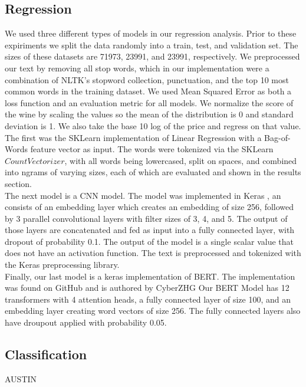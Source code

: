 \documentclass[11pt]{article}
\begin{document}
\subsection{Regression}
    We used three different types of models in our regression analysis. Prior to these expiriments we split the data randomly into a train, test, and validation set. The sizes of these datasets are 71973, 23991, and 23991, respectively. We preprocessed our text by removing all stop words, which in our implementation were a combination of NLTK's stopword collection, punctuation, and the top 10 most common words in the training dataset. We used Mean Squared Error as both a loss function and an evaluation metric for all models. We normalize the score of the wine by scaling the values so the mean of the distribution is 0 and standard deviation is 1. We also take the base 10 log of the price and regress on that value. \\
    The first was the SKLearn implementation of Linear Regression with a Bag-of-Words feature vector as input. The words were tokenized via the SKLearn $CountVectorizer$, with all words being lowercased, split on spaces, and combined into ngrams of varying sizes, each of which are evaluated and shown in the results section. \\
    The next model is a CNN model. The model was implemented in Keras \cite{keras}, an consists of an embedding layer which creates an embedding of size 256, followed by 3 parallel convolutional layers with filter sizes of 3, 4, and 5. The output of those layers are concatenated and fed as input into a fully connected layer, with dropout of probability 0.1. The output of the model is a single scalar value that does not have an activation function. The text is preprocessed and tokenized with the Keras preprocessing library. \\
    Finally, our last model is a keras \cite{keras} implementation of BERT. The implementation was found on GitHub and is authored by CyberZHG \cite{keras_bert} Our BERT Model has 12 transformers with 4 attention heads, a fully connected layer of size 100, and an embedding layer creating word vectors of size 256. The fully connected layers also have droupout applied with probability 0.05.

\subsection{Classification}
AUSTIN
\end{document}
